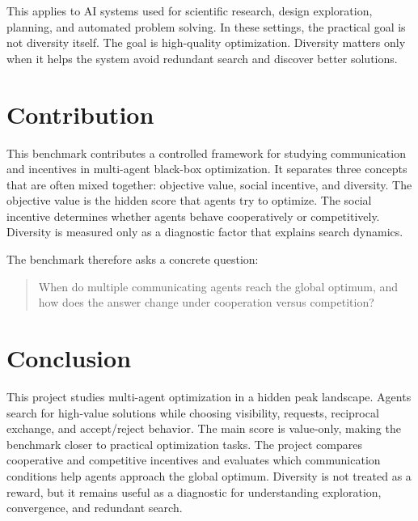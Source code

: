 \documentclass[11pt]{article}
\begin{document}
This applies to AI systems used for scientific research, design exploration, planning, and automated problem solving. In these settings, the practical goal is not diversity itself. The goal is high-quality optimization. Diversity matters only when it helps the system avoid redundant search and discover better solutions.

\section{Contribution}

This benchmark contributes a controlled framework for studying communication and incentives in multi-agent black-box optimization. It separates three concepts that are often mixed together: objective value, social incentive, and diversity. The objective value is the hidden score that agents try to optimize. The social incentive determines whether agents behave cooperatively or competitively. Diversity is measured only as a diagnostic factor that explains search dynamics.

The benchmark therefore asks a concrete question:

\begin{quote}
When do multiple communicating agents reach the global optimum, and how does the answer change under cooperation versus competition?
\end{quote}

\section{Conclusion}

This project studies multi-agent optimization in a hidden peak landscape. Agents search for high-value solutions while choosing visibility, requests, reciprocal exchange, and accept/reject behavior. The main score is value-only, making the benchmark closer to practical optimization tasks. The project compares cooperative and competitive incentives and evaluates which communication conditions help agents approach the global optimum. Diversity is not treated as a reward, but it remains useful as a diagnostic for understanding exploration, convergence, and redundant search.
\end{document}
